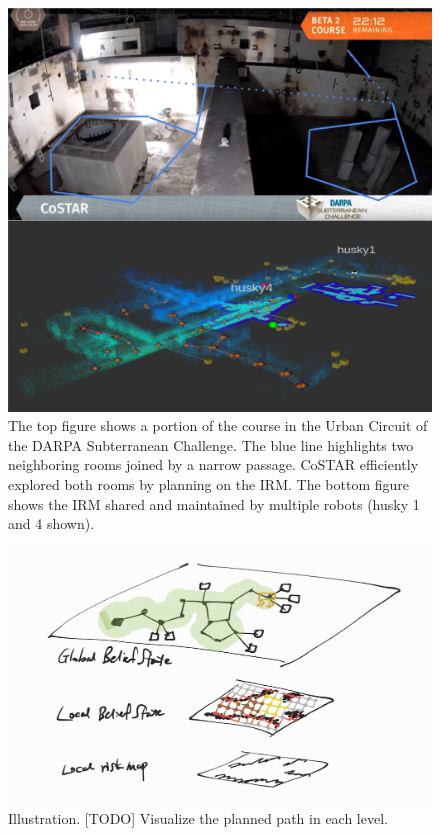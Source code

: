 \documentclass{article}
\newcommand{\ph}[1]{{\textbf{#1}:}} %
\begin{document}

\begin{figure}[t!]
  \centering
  \includegraphics[width=.48\textwidth]{figures/firstpage_v2.png}
  \caption{The top figure shows a portion of the course in the Urban Circuit of the DARPA Subterranean Challenge. The blue line highlights two neighboring rooms joined by a narrow passage. CoSTAR efficiently explored both rooms by planning on the IRM. The bottom figure shows the IRM shared and maintained by multiple robots (husky 1 and 4 shown).}
  \label{fig:firstPage}
\end{figure}

\begin{figure}[t!]
  \centering
  \includegraphics[width=.6\textwidth]{IRM_Planning/figures/sketch_hierarchical_belief_space.png}
  \caption{Illustration. [TODO] Visualize the planned path in each level.}
  \label{fig:illustration}
\end{figure}
\end{document}
